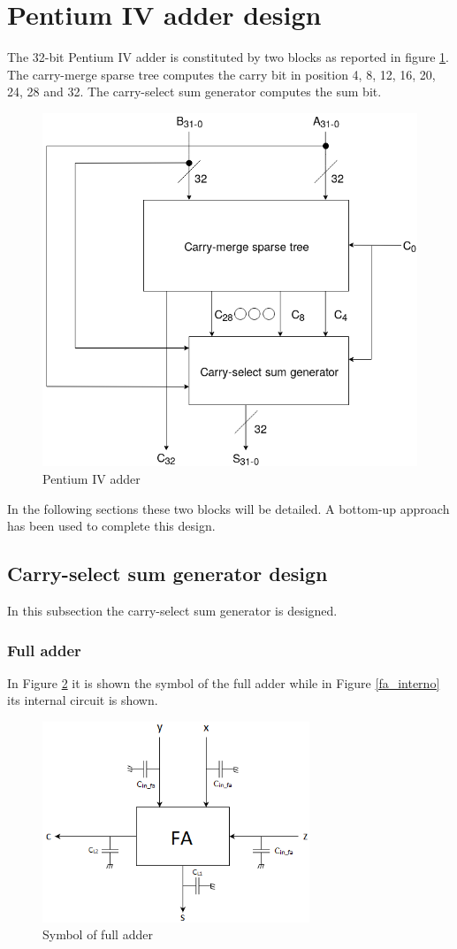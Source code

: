 \section{Pentium IV adder design}
The 32-bit Pentium IV adder is constituted by two blocks as reported in figure \ref{pentiumIV}. The carry-merge sparse tree computes the carry bit in position 4, 8, 12, 16, 20, 24, 28 and 32. The carry-select sum generator computes the sum bit.\\
\begin{figure}[H]
\centering
\includegraphics[width = 10 cm]{pentium/pentiumIV.png}
\caption{Pentium IV adder}
\label{pentiumIV}
\end{figure}
In the following sections these two blocks will be detailed. A bottom-up approach has been used to complete this design.





\subsection{Carry-select sum generator design}
In this subsection the carry-select sum generator is designed. 


\subsubsection{Full adder}
In Figure \ref{fa_black_box} it is shown the symbol of the full adder while in Figure \ref{fa_interno} its internal circuit is shown.


\begin{figure}[H]
\centering
\includegraphics[width = 8cm]{pentium/fa_black_box.png}
\caption{Symbol of full adder}
\label{fa_black_box}
\end{figure}

